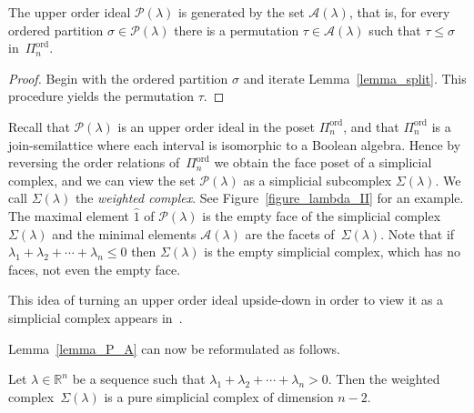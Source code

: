 \documentclass[ALCO,ThmDefs,Unicode,epreuves]{cedram}
\newcommand{\Rrr}{\mathbb{R}}
\DeclareMathOperator{\ord}{ord}
\newcommand{\ho}{\hat{1}}
\newcommand{\Qn}{\Pi^{\ord}_{n}}
\newcommand{\lambdasumpositive}
{\lambda_{1} + \lambda_{2} + \cdots + \lambda_{n} > 0}
\newcommand{\lambdasumnonpositive}
{\lambda_{1} + \lambda_{2} + \cdots + \lambda_{n} \leq 0}
\begin{document}
\begin{lemma}
The upper order ideal $\mathcal{P}(\lambda)$
is generated by the set $\mathcal{A}(\lambda)$,
that is, for every ordered partition $\sigma \in \mathcal{P}(\lambda)$
there is a permutation $\tau \in \mathcal{A}(\lambda)$
such that $\tau \leq \sigma$ in~$\Qn$.
\label{lemma_P_A}
\end{lemma}
\begin{proof}
Begin with the ordered partition $\sigma$
and iterate Lemma~\ref{lemma_split}.
This procedure yields the permutation $\tau$.
\end{proof}




Recall that $\mathcal{P}(\lambda)$
is an upper order ideal in the poset $\Qn$, and that
$\Qn$ is a join-semilattice
where each interval is isomorphic to a Boolean algebra.
Hence by reversing the order relations of~$\Qn$
we obtain the face poset of a simplicial
complex, and
we can view the set $\mathcal{P}(\lambda)$
as a simplicial subcomplex
$\Sigma(\lambda)$.
We call
$\Sigma(\lambda)$
the \emph{weighted complex}.
See Figure~\ref{figure_lambda_II} for an example.
The maximal element $\ho$ of $\mathcal{P}(\lambda)$
is the empty face of the simplicial complex $\Sigma(\lambda)$ 
and the minimal elements $\mathcal{A}(\lambda)$ are
the facets of~$\Sigma(\lambda)$.
Note that if $\lambdasumnonpositive$ then
$\Sigma(\lambda)$ is the empty simplicial complex,
which has no faces, not even the empty face.

This idea of turning an upper order ideal upside-down
in order to view it as a simplicial complex
appears in~\cite{Ehrenborg_Hedmark,Ehrenborg_Jung}.




Lemma~\ref{lemma_P_A}
can now be reformulated as follows.
\begin{lemma}
Let $\lambda \in \Rrr^{n}$ be a sequence
such that $\lambdasumpositive$.
Then
the weighted complex~$\Sigma(\lambda)$
is a pure simplicial complex of dimension $n-2$.
\label{lemma_pure}
\end{lemma}
\end{document}
